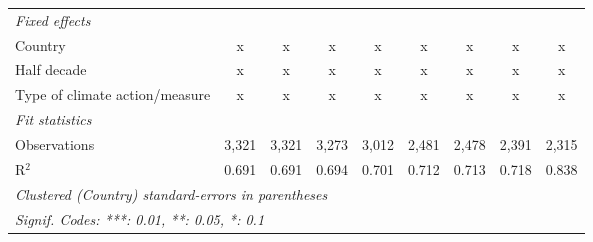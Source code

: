 \begin{table}[htbp]
\begin{tabular}{lcccccccc}
      \emph{Fixed effects}\\
      Country                                                               & x            & x            & x            & x           & x            & x            & x           & x\\  
      Half decade                                                           & x            & x            & x            & x           & x            & x            & x           & x\\  
      Type of climate action/measure                                        & x            & x            & x            & x           & x            & x            & x           & x\\  
      \midrule \emph{Fit statistics}\\
      Observations                                                          & 3,321        & 3,321        & 3,273        & 3,012       & 2,481        & 2,478        & 2,391       & 2,315\\  
      R$^2$                                                                 & 0.691        & 0.691        & 0.694        & 0.701       & 0.712        & 0.713        & 0.718       & 0.838\\  
      \midrule
      \multicolumn{9}{l}{\emph{Clustered (Country) standard-errors in parentheses}}\\
      \multicolumn{9}{l}{\emph{Signif. Codes: ***: 0.01, **: 0.05, *: 0.1}}\\
   \end{tabular}
\end{table}



